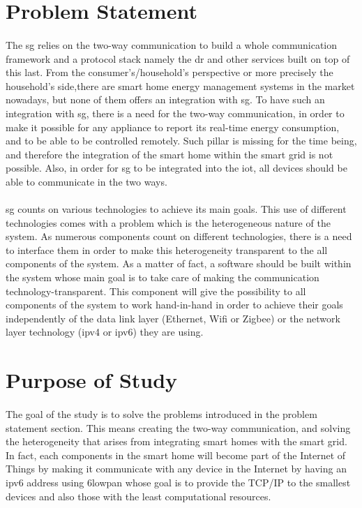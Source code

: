 \documentclass[oneside,12pt,a4paper,final]{book}
\begin{document}
\section{Problem Statement}
\paragraph{}
The  \gls{sg} relies on the two-way communication to build a whole communication framework and a protocol stack namely the \gls{dr} and other services built on top of this last. From the consumer's/household's perspective or more precisely the household's side,there are smart home energy management systems in the market nowadays, but none of them offers an integration with \gls{sg}. To have such an integration with \gls{sg}, there is a need for the two-way communication, in order to make it possible for any appliance to report its real-time energy consumption, and to be able to be controlled remotely. Such pillar is missing for the time being, and therefore the integration of the smart home within the smart grid is not possible. Also, in order for \gls{sg} to be integrated into the \gls{iot}, all devices should be able to communicate in the two ways.
\paragraph{}
\gls{sg} counts on various technologies to achieve its main goals. This use of different technologies comes with a problem which is the heterogeneous nature of the system. As numerous components count on different technologies, there is a need to interface them in order to make this heterogeneity transparent to the all components of the system. As a matter of fact, a software should be built within the system whose main goal is to take care of making the communication technology-transparent. This component will give the possibility to all components of the system to work hand-in-hand in order to achieve their goals independently of the data link layer (Ethernet, Wifi or Zigbee) or the network layer technology (\gls{ipv4} or \gls{ipv6}) they are using.

\section{Purpose of Study}
 \paragraph{}
The goal of the study is to solve the problems introduced in the problem statement section. This means creating the two-way communication, and solving the heterogeneity that arises from integrating smart homes with the smart grid. In fact, each components in the smart home will become part of the Internet of Things by making it communicate with any device in the Internet by having an \gls{ipv6} address using \gls{6lowpan} whose goal is to provide the TCP/IP to the smallest devices and also those with the least computational resources.
\end{document}

